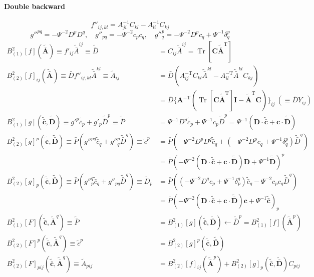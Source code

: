 \documentclass{article}
\begin{document}
\paragraph{Double backward}
$$
f''_{ij,kl}=A^{-1}_{ji}C_{kl}-A^{-1}_{li}C_{kj}
$$
%
$$
g''^{pq}=-\Psi^{-2}D^pD^q,\quad
g''_{pq}=-\Psi^{-2}c_pc_q,\quad
g''^p_q=-\Psi^{-2}D^pc_q+\Psi^{-1}\delta^p_q
$$
%
$$
\begin{aligned}
B_{(1)}^2[f](\tilde{\bar{\mathbf A}})
\equiv f'_{ij}\tilde{\bar A}^{ij}
\equiv\tilde{\bar D}
&=C_{ij}\tilde{\bar A}^{ij}
=\operatorname{Tr}[\mathbf C\tilde{\bar{\mathbf A}}^\mathrm T]
\\
B_{(2)}^2[f]_{ij}(\tilde{\bar{\mathbf A}})
\equiv\bar Df''_{ij,kl}\tilde{\bar A}^{kl}
\equiv\tilde A_{ij}&=
\bar D(A^{-\mathrm T}_{ij}C_{kl}\tilde{\bar A}^{kl}-A^{-\mathrm T}_{il}\tilde{\bar A}^{kl}C_{kj}) \\
&=\bar D\{\mathbf A^{-\mathrm T}(\operatorname{Tr}[\mathbf C\tilde{\bar{\mathbf A}}^\mathrm T]\mathbf I-\tilde{\bar{\mathbf A}}^\mathrm T\mathbf C)\}_{ij}\ (\equiv\bar DY_{ij})
\\
B_{(1)}^2[g](\tilde{\bar{\mathbf c}},\tilde{\bar{\mathbf D}})
\equiv g'^p\tilde{\bar c}_p+g'_p\tilde{\bar D}^p
\equiv\tilde{\bar P}
&=\Psi^{-1}D^p\tilde{\bar c}_p+\Psi^{-1}c_p\tilde{\bar D}^p=\Psi^{-1}(\mathbf D\cdot\tilde{\bar{\mathbf c}}+\mathbf c\cdot\tilde{\bar{\mathbf D}})
\\
B_{(2)}^2[g]^p(\tilde{\bar{\mathbf c}},\tilde{\bar{\mathbf D}})
\equiv\bar P(g''^{pq}\tilde{\bar c}_q+g''^p_q\tilde{\bar D}^q)
\equiv\tilde c^p
&=\bar P(-\Psi^{-2}D^pD^q\tilde{\bar c}_q+(-\Psi^{-2}D^pc_q+\Psi^{-1}\delta^p_q)\tilde{\bar D}^q) \\
&=\bar P(-\Psi^{-2}(\mathbf D\cdot\tilde{\bar{\mathbf c}}+\mathbf c\cdot\tilde{\bar{\mathbf D}})\mathbf D+\Psi^{-1}\tilde{\bar{\mathbf D}})^p
\\
B_{(2)}^2[g]_p(\tilde{\bar{\mathbf c}},\tilde{\bar{\mathbf D}})
\equiv\bar P(g''^q_p\tilde{\bar c}_q+g''_{pq}\tilde{\bar D}^q)
\equiv\tilde D_p
&=\bar P((-\Psi^{-2}D^qc_p+\Psi^{-1}\delta^q_p)\tilde{\bar c}_q-\Psi^{-2}c_pc_q\tilde{\bar D}^q) \\
&=\bar P(-\Psi^{-2}(\mathbf D\cdot\tilde{\bar{\mathbf c}}+\mathbf c\cdot\tilde{\bar{\mathbf D}})\mathbf c+\Psi^{-1}\tilde{\bar{\mathbf c}})_p
\\
B_{(1)}^2[F](\tilde{\bar{\mathbf c}},\tilde{\bar{\mathbf A}}^q)
\equiv\tilde{\bar P}
&=B_{(1)}^2[g](\tilde{\bar{\mathbf c}},\tilde{\bar{\mathbf D}})
\leftarrow\tilde{\bar D}^p=B^2_{(1)}[f](\tilde{\bar{\mathbf A}}^p)
\\
B_{(2)}^2[F]^p(\tilde{\bar{\mathbf c}},\tilde{\bar{\mathbf A}}^q)
\equiv\tilde c^p
&=B^2_{(2)}[g]^p(\tilde{\bar{\mathbf c}},\tilde{\bar{\mathbf D}})
\\
B_{(2)}^2[F]_{pij}(\tilde{\bar{\mathbf c}},\tilde{\bar{\mathbf A}}^q)
\equiv\tilde A_{pij}
&=B^2_{(2)}[f]_{ij}(\tilde{\bar{\mathbf A}}^p)+B^2_{(2)}[g]_p(\tilde{\bar{\mathbf c}},\tilde{\bar{\mathbf D}})C_{pij}
\end{aligned}
$$
\end{document}
